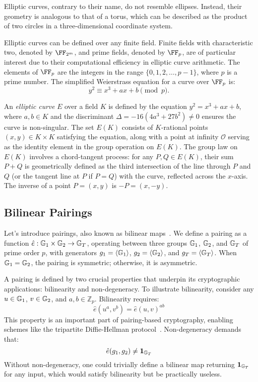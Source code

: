 \documentclass{iacrcc}
\begin{document}
Elliptic curves, contrary to their name, do not resemble ellipses. Instead, their geometry is analogous to that of a torus, which can be described as the product of two circles in a three-dimensional coordinate system.

Elliptic curves can be defined over any finite field. Finite fields with characteristic two, denoted by \( \FF_{2^m} \), and prime fields, denoted by \( \FF_p \), are of particular interest due to their computational efficiency in elliptic curve arithmetic. The elements of \( \FF_p \) are the integers in the range \( \{0, 1, 2, \ldots, p-1\} \), where \( p \) is a prime number. The simplified Weierstrass equation for a curve over \( \FF_p \) is:
\[
y^2 \equiv x^3 + ax + b \pmod{p}.
\]

\begin{definition}
    An \textit{elliptic curve} \( E \) over a field \( K \) is defined by the equation \( y^2 = x^3 + ax + b \), where \( a, b \in K \) and the discriminant \( \Delta = -16(4a^3 + 27b^2) \neq 0 \) ensures the curve is non-singular. The set \( E(K) \) consists of \( K \)-rational points \( (x, y) \in K \times K \) satisfying the equation, along with a point at infinity \( \mathcal{O} \) serving as the identity element in the group operation on \( E(K) \). The group law on \( E(K) \) involves a chord-tangent process: for any \( P, Q \in E(K) \), their sum \( P + Q \) is geometrically defined as the third intersection of the line through \( P \) and \( Q \) (or the tangent line at \( P \) if \( P = Q \)) with the curve, reflected across the \( x \)-axis. The inverse of a point \( P = (x, y) \) is \( -P = (x, -y) \).
\end{definition}

\subsection{Bilinear Pairings}

Let's introduce pairings, also known as bilinear maps~\cite{AC:BonLynSha01,JC:BonLynSha04}. We define a pairing as a function \( \hat{e} : \mathbb{G}_1 \times \mathbb{G}_2 \rightarrow \mathbb{G}_T \), operating between three groups \(\mathbb{G}_1\), \(\mathbb{G}_2\), and \(\mathbb{G}_T\) of prime order \( p \), with generators \( g_1 = \langle \mathbb{G}_1 \rangle \), \( g_2 = \langle \mathbb{G}_2 \rangle \), and \( g_T = \langle \mathbb{G}_T \rangle \). When \(\mathbb{G}_1 = \mathbb{G}_2\), the pairing is symmetric; otherwise, it is asymmetric.

A pairing is defined by two crucial properties that underpin its cryptographic applications: bilinearity and non-degeneracy. To illustrate bilinearity, consider any \( u \in \mathbb{G}_1 \), \( v \in \mathbb{G}_2 \), and \( a, b \in \mathbb{Z}_p \). Bilinearity requires:
\[
\hat{e}(u^a, v^b) = \hat{e}(u, v)^{ab}
\]
This property is an important part of pairing-based cryptography, enabling schemes like the tripartite Diffie-Hellman protocol~\cite{JC:Joux04}. Non-degeneracy demands that:
\[
\hat{e}(g_1, g_2) \neq \mathbf{1}_{\mathbb{G}_T}
\]
Without non-degeneracy, one could trivially define a bilinear map returning \(\mathbf{1}_{\mathbb{G}_T}\) for any input, which would satisfy bilinearity but be practically useless.
\end{document}
